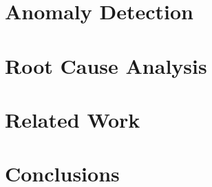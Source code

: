 \documentclass[acmsmall,nonacm]{acmart} %
\begin{document}
\section{Anomaly Detection}
\label{sec:detection}


\section{Root Cause Analysis}
\label{sec:rca}


\section{Related Work}
\label{sec:related}


\section{Conclusions}
\label{sec:conclusions}






\end{document}
